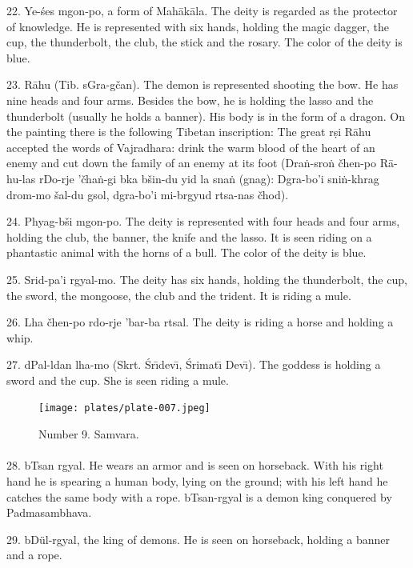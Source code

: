 \documentclass[a4paper, 12pt, oneside]{article}
\begin{document}
22. Ye-\'{s}es mgon-po, a form of Mah\={a}k\={a}la. The deity is regarded as the protector of knowledge. He is represented with six hands, holding the magic dagger, the cup, the thunderbolt, the club, the stick and the rosary. The color of the deity is blue.

23. R\={a}hu (Tib. sGra-gčan). The demon is represented shooting the bow. He has nine heads and four arms. Besides the bow, he is holding the lasso and the thunderbolt (usually he holds a banner). His body is in the form of a dragon. On the painting there is the following Tibetan inscription: The great r\d{s}i R\={a}hu accepted the words of Vajradhara: drink the warm blood of the heart of an enemy and cut down the family of an enemy at its foot (Dra\.{n}-sro\.{n} čhen-po R\={a}-hu-las rDo-rje 'čha\.{n}-gi bka bšin-du yid la sna\.{n} (gnag): Dgra-bo'i sni\.{n}-khrag drom-mo šal-du gsol, dgra-bo'i mi-brgyud rtsa-nas čhod).

24. Phyag-bši mgon-po. The deity is represented with four heads and four arms, holding the club, the banner, the knife and the lasso. It is seen riding on a phantastic animal with the horns of a bull. The color of the deity is blue.

25. Srid-pa'i rgyal-mo. The deity has six hands, holding the thunderbolt, the cup, the sword, the mongoose, the club and the trident. It is riding a mule.

26. Lha čhen-po rdo-rje 'bar-ba rtsal. The deity is riding a horse and holding a whip.

27. dPal-ldan lha-mo (Skrt. \'{S}r\={\i}dev\={\i}, \'{S}rimat\={\i} Dev\={\i}). The goddess is holding a sword and the cup. She is seen riding a mule.

\clearpage
\vspace*{\fill}
\begin{figure}[H]
\centering
\texttt{[image: plates/plate-007.jpeg]}
\caption*{Number 9. Samvara.}
\end{figure}
\vspace*{\fill}
\clearpage
\paragraph{}
28. bTsan rgyal. He wears an armor and is seen on horseback. With his right hand he is spearing a human body, lying on the ground; with his left hand he catches the same body with a rope. bTsan-rgyal is a demon king conquered by Padmasambhava.

29. bDül-rgyal, the king of demons. He is seen on horseback, holding a banner and a rope.
\end{document}
